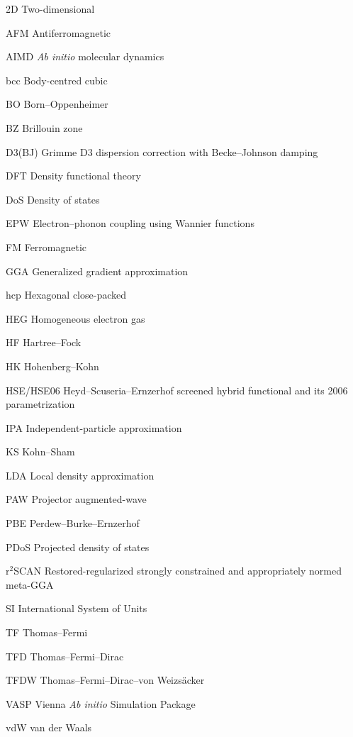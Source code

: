 \singlespacing



\begin{thesisfrontmatterentries}
  \item[2D] Two-dimensional
  \item[AFM] Antiferromagnetic
  \item[AIMD] \textit{Ab initio} molecular dynamics
  \item[bcc] Body-centred cubic
  \item[BO] Born--Oppenheimer
  \item[BZ] Brillouin zone
  \item[D3(BJ)] Grimme D3 dispersion correction with Becke--Johnson damping
  \item[DFT] Density functional theory
  \item[DoS] Density of states
  \item[EPW] Electron--phonon coupling using Wannier functions
  \item[FM] Ferromagnetic
  \item[GGA] Generalized gradient approximation
  \item[hcp] Hexagonal close-packed
  \item[HEG] Homogeneous electron gas
  \item[HF] Hartree--Fock
  \item[HK] Hohenberg--Kohn
  \item[HSE/HSE06] Heyd--Scuseria--Ernzerhof screened hybrid functional and its 2006 parametrization
  \item[IPA] Independent-particle approximation
  \item[KS] Kohn--Sham
  \item[LDA] Local density approximation
  \item[PAW] Projector augmented-wave
  \item[PBE] Perdew--Burke--Ernzerhof
  \item[PDoS] Projected density of states
  \item[\(\mathrm{r}^{2}\)SCAN] Restored-regularized strongly constrained and appropriately normed meta-GGA
  \item[SI] International System of Units
  \item[TF] Thomas--Fermi
  \item[TFD] Thomas--Fermi--Dirac
  \item[TFDW] Thomas--Fermi--Dirac--von Weizs\"acker
  \item[VASP] Vienna \textit{Ab initio} Simulation Package
  \item[vdW] van der Waals
\end{thesisfrontmatterentries}

